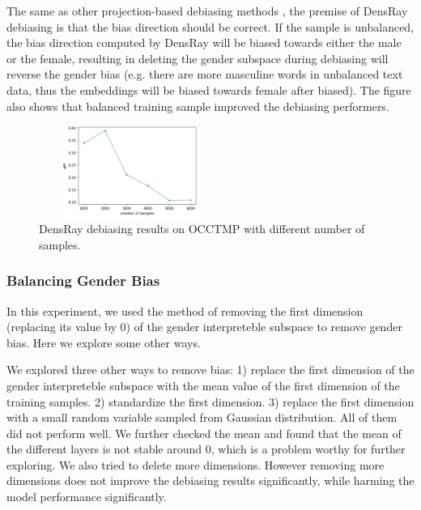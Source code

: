 The same as other projection-based debiasing methods \citep{bolukbasi2016man,zhao2019gender,dev2019attenuating, karve2019conceptor}, the premise of DensRay debiasing is that the bias direction should be correct. If the sample is unbalanced, the bias direction computed by DensRay will be biased towards either the male or the female, resulting in deleting the gender subspace during debiasing will reverse the gender bias (e.g. there are more masculine words in unbalanced text data, thus the embeddings will be biased towards female after biased). The figure also shows that balanced training sample improved the debiasing performers. 
\begin{figure}[ht]
    \centering
    \includegraphics[width=6cm,height=3cm]{samples}
    \caption{DensRay debiasing results on OCCTMP with different number of samples.}
    \label{fig:my_label}
\end{figure}

\subsubsection{Balancing Gender Bias}
In this experiment, we used the method of removing the first dimension (replacing its value by $0$) of the gender interpreteble subspace to remove gender bias. Here we explore some other ways.

We explored three other ways to remove bias: 1) replace the first dimension of the gender interpreteble subspace with the mean value of the first dimension of the training samples. 2) standardize the first dimension. 3) replace the first dimension with a small random variable sampled from Gaussian distribution. All of them did not perform well. We further checked the mean and found that the mean of the different layers is not stable around 0, which is a problem worthy for further exploring. We also tried to delete more dimensions. However removing more dimensions does not improve the debiasing results significantly, while harming the model performance significantly.


